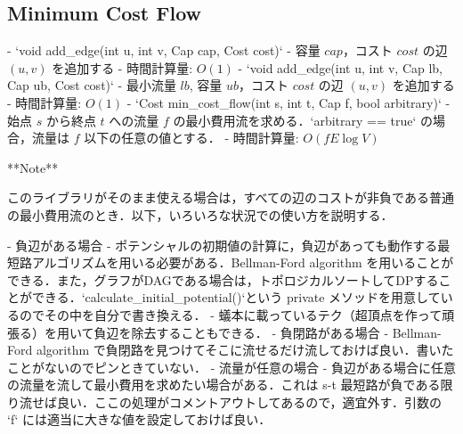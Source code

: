 \subsection{Minimum Cost Flow}

\begin{small}
\begin{markdown}
- `void add\_edge(int u, int v, Cap cap, Cost cost)`
    - 容量 $cap$，コスト $cost$ の辺 $(u, v)$ を追加する
    - 時間計算量: $O(1)$
- `void add\_edge(int u, int v, Cap lb, Cap ub, Cost cost)`
    - 最小流量 $lb$, 容量 $ub$，コスト $cost$ の辺 $(u, v)$ を追加する
    - 時間計算量: $O(1)$
- `Cost min\_cost\_flow(int s, int t, Cap f, bool arbitrary)`
    - 始点 $s$ から終点 $t$ への流量 $f$ の最小費用流を求める．`arbitrary == true` の場合，流量は $f$ 以下の任意の値とする．
    - 時間計算量: $O(fE\log V)$

**Note**

このライブラリがそのまま使える場合は，すべての辺のコストが非負である普通の最小費用流のとき．以下，いろいろな状況での使い方を説明する．

- 負辺がある場合
    - ポテンシャルの初期値の計算に，負辺があっても動作する最短路アルゴリズムを用いる必要がある．Bellman-Ford algorithm を用いることができる．また，グラフがDAGである場合は，トポロジカルソートしてDPすることができる．`calculate\_initial\_potential()`という private メソッドを用意しているのでその中を自分で書き換える．
    - 蟻本に載っているテク（超頂点を作って頑張る）を用いて負辺を除去することもできる．
- 負閉路がある場合
    - Bellman-Ford algorithm で負閉路を見つけてそこに流せるだけ流しておけば良い．書いたことがないのでピンときていない．
- 流量が任意の場合
    - 負辺がある場合に任意の流量を流して最小費用を求めたい場合がある．これは s-t 最短路が負である限り流せば良い．ここの処理がコメントアウトしてあるので，適宜外す．引数の `f` には適当に大きな値を設定しておけば良い．
\end{markdown}
\end{small}

